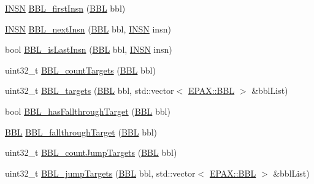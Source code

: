 \begin{DoxyCompactItemize}
\item 
\hyperlink{namespace_e_p_a_x_a601da5f2ead9a877d566da6cfc9026eb}{\-I\-N\-S\-N} \hyperlink{namespace_e_p_a_x_a12456a3f644f733fea42a1789f25e253}{\-B\-B\-L\-\_\-first\-Insn} (\hyperlink{namespace_e_p_a_x_a0ad4f6573b03fa5c375bed0e68d4fab0}{\-B\-B\-L} bbl)
\item 
\hyperlink{namespace_e_p_a_x_a601da5f2ead9a877d566da6cfc9026eb}{\-I\-N\-S\-N} \hyperlink{namespace_e_p_a_x_a6a61743efee9f1d514f700439188ae35}{\-B\-B\-L\-\_\-next\-Insn} (\hyperlink{namespace_e_p_a_x_a0ad4f6573b03fa5c375bed0e68d4fab0}{\-B\-B\-L} bbl, \hyperlink{namespace_e_p_a_x_a601da5f2ead9a877d566da6cfc9026eb}{\-I\-N\-S\-N} insn)
\item 
bool \hyperlink{namespace_e_p_a_x_a74200da4cf0db88248f6c349d85799bf}{\-B\-B\-L\-\_\-is\-Last\-Insn} (\hyperlink{namespace_e_p_a_x_a0ad4f6573b03fa5c375bed0e68d4fab0}{\-B\-B\-L} bbl, \hyperlink{namespace_e_p_a_x_a601da5f2ead9a877d566da6cfc9026eb}{\-I\-N\-S\-N} insn)
\item 
uint32\-\_\-t \hyperlink{namespace_e_p_a_x_a48ec506044b94cd90da90048d6bedb20}{\-B\-B\-L\-\_\-count\-Targets} (\hyperlink{namespace_e_p_a_x_a0ad4f6573b03fa5c375bed0e68d4fab0}{\-B\-B\-L} bbl)
\item 
uint32\-\_\-t \hyperlink{namespace_e_p_a_x_ad4eb35cea61f32b54be0ff4126a6ac3d}{\-B\-B\-L\-\_\-targets} (\hyperlink{namespace_e_p_a_x_a0ad4f6573b03fa5c375bed0e68d4fab0}{\-B\-B\-L} bbl, std\-::vector$<$ \hyperlink{namespace_e_p_a_x_a0ad4f6573b03fa5c375bed0e68d4fab0}{\-E\-P\-A\-X\-::\-B\-B\-L} $>$ \&bbl\-List)
\item 
bool \hyperlink{namespace_e_p_a_x_ad737f9e0fcf37a929d40989b8b04afc7}{\-B\-B\-L\-\_\-has\-Fallthrough\-Target} (\hyperlink{namespace_e_p_a_x_a0ad4f6573b03fa5c375bed0e68d4fab0}{\-B\-B\-L} bbl)
\item 
\hyperlink{namespace_e_p_a_x_a0ad4f6573b03fa5c375bed0e68d4fab0}{\-B\-B\-L} \hyperlink{namespace_e_p_a_x_a406a64b3b42d7c7e85d2f505b9d72fb2}{\-B\-B\-L\-\_\-fallthrough\-Target} (\hyperlink{namespace_e_p_a_x_a0ad4f6573b03fa5c375bed0e68d4fab0}{\-B\-B\-L} bbl)
\item 
uint32\-\_\-t \hyperlink{namespace_e_p_a_x_af4bf20df6784bc507a3a87749657b5c8}{\-B\-B\-L\-\_\-count\-Jump\-Targets} (\hyperlink{namespace_e_p_a_x_a0ad4f6573b03fa5c375bed0e68d4fab0}{\-B\-B\-L} bbl)
\item 
uint32\-\_\-t \hyperlink{namespace_e_p_a_x_aeb19b9c8d8f808a3aeb9d9890f95491a}{\-B\-B\-L\-\_\-jump\-Targets} (\hyperlink{namespace_e_p_a_x_a0ad4f6573b03fa5c375bed0e68d4fab0}{\-B\-B\-L} bbl, std\-::vector$<$ \hyperlink{namespace_e_p_a_x_a0ad4f6573b03fa5c375bed0e68d4fab0}{\-E\-P\-A\-X\-::\-B\-B\-L} $>$ \&bbl\-List)

\end{DoxyCompactItemize}
